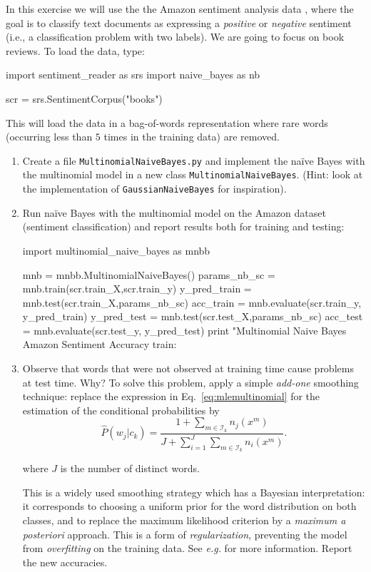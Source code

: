 \begin{exercise}
In this exercise we will use the the Amazon sentiment analysis data \citep{blitzer2007biographies}, 
where the goal is to classify text documents as expressing a \emph{positive} or \emph{negative} sentiment 
(i.e., a classification problem with two labels). We are going to focus on book reviews. 
To load the data, type:
\begin{python}
import sentiment_reader as srs
import naive_bayes as nb

scr = srs.SentimentCorpus("books")
\end{python}
This will load the data in a bag-of-words representation where rare words (occurring less than $5$ times in the training data) are removed. 

\begin{enumerate}
\item Create a file {\tt MultinomialNaiveBayes.py} and implement the na\"ive Bayes with the multinomial model in a new class
  {\tt MultinomialNaiveBayes}. (Hint: look at the implementation of {\tt GaussianNaiveBayes} for inspiration).
\item Run na\"ive Bayes with the multinomial model on the Amazon
  dataset (sentiment classification) and report results both for
  training and testing: 
    
\begin{python}
import multinomial_naive_bayes as mnbb

mnb = mnbb.MultinomialNaiveBayes()
params_nb_sc = mnb.train(scr.train_X,scr.train_y)
y_pred_train = mnb.test(scr.train_X,params_nb_sc)
acc_train = mnb.evaluate(scr.train_y, y_pred_train)
y_pred_test = mnb.test(scr.test_X,params_nb_sc)
acc_test = mnb.evaluate(scr.test_y, y_pred_test)
print "Multinomial Naive Bayes Amazon Sentiment Accuracy train: %
\end{python}


\item Observe that words that were not observed at training time cause problems at test time. Why? 
To solve this problem, apply a simple \emph{add-one} smoothing technique: replace the expression in Eq.~\ref{eq:mlemultinomial} 
for the estimation of the conditional probabilities 
by
$${\hat P}(w_j|c_k) = \frac{1+\sum_ {m \in \mathcal{I}_k} n_j(x^m)}{J + \sum_{i=1}^J \sum_ {m\in \mathcal{I}_k} n_i(x^m)}.$$


where $J$ is the number of distinct words. 

This is a widely used smoothing strategy which has a Bayesian interpretation: it corresponds to choosing a uniform prior 
for the word distribution on both classes, and to replace the maximum likelihood criterion by a \emph{maximum a posteriori} approach. 
This is a form of \emph{regularization}, preventing the model from \emph{overfitting} on the training data. 
See \emph{e.g.} \citet{Manning1999,Manning2008} for more information. 
Report the new accuracies. 
\end{enumerate}
\end{exercise}


